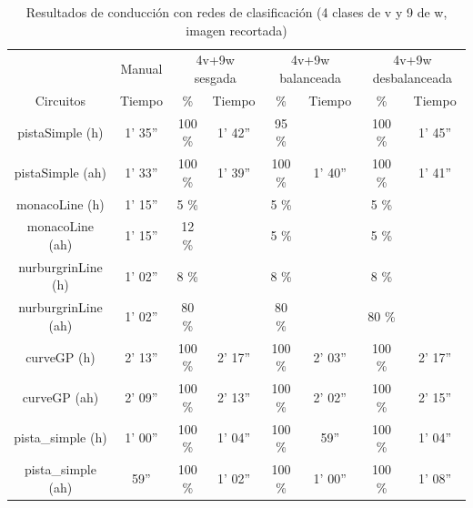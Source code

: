 \begin{table}[H]
\centering
\caption{Resultados de conducción con redes de clasificación (4 clases de v y 9 de w, imagen recortada)}
\label{resultados_classificacion_recortada_4v_9w}
\begin{tabular}{c|c|c|c|c|c|c|c|}
\cline{2-8}
                          & \multicolumn{1}{c|}{Manual} & \multicolumn{2}{c|}{4v+9w sesgada} & \multicolumn{2}{c|}{4v+9w balanceada} & \multicolumn{2}{c|}{4v+9w desbalanceada} \\ \cline{1-8} 
                        \multicolumn{1}{|c|}{Circuitos}    & Tiempo       & \%       & Tiempo       & \%        & Tiempo       & \%      & Tiempo     \\ \hline
\multicolumn{1}{|c|}{pistaSimple (h)}    & 1' 35''           & 100 \%   & 1' 42''           & 95 \%         &        & 100 \%       & 1' 45''       \\ \hline
\multicolumn{1}{|c|}{pistaSimple (ah)}     & 1' 33''           & 100 \%       & 1' 39''            & 100 \%           & 1' 40''    & 100 \%     & 1' 41''\\ \hline
\multicolumn{1}{|c|}{monacoLine (h)}      & 1' 15''           & 5 \%      &             & 5 \%    &         & 5 \%      &           \\ \hline
\multicolumn{1}{|c|}{monacoLine (ah)}       & 1' 15''            & 12 \%     &             & 5 \%          &        & 5 \%         &      \\ \hline
\multicolumn{1}{|c|}{nurburgrinLine (h)}      & 1' 02''            & 8 \%         &         & 8 \%       &    & 8 \%      &     \\ \hline
\multicolumn{1}{|c|}{nurburgrinLine (ah)}       & 1' 02''           & 80 \%          &           & 80 \%      &            & 80 \%       &       \\ \hline
\multicolumn{1}{|c|}{curveGP (h)}     & 2' 13''      & 100 \%      & 2' 17''          & 100 \%        & 2' 03''          & 100 \%      & 2' 17''   \\ \hline
\multicolumn{1}{|c|}{curveGP (ah)}       & 2' 09''    & 100 \%        & 2' 13''        & 100 \%    & 2' 02''    & 100 \%       & 2' 15''     \\ \hline
\multicolumn{1}{|c|}{pista\_simple (h)}       & 1' 00''           & 100 \%        & 1' 04''          & 100 \%       & 59''            & 100 \%       & 1' 04''   \\ \hline
\multicolumn{1}{|c|}{pista\_simple (ah)}     & 59''            & 100 \%    & 1' 02''   & 100 \%        & 1' 00''     & 100 \%     & 1' 08''    \\ \hline
\end{tabular}
\end{table}



